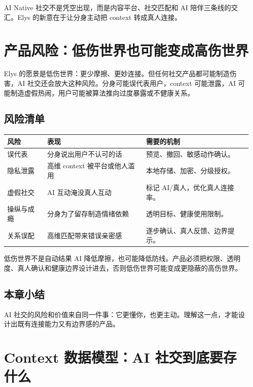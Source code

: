 \documentclass[a4paper]{article}
\begin{document}
AI Native 社交不是凭空出现，而是内容平台、社交匹配和 AI 陪伴三条线的交汇。Elys 的新意在于让分身主动把 context 转成真人连接。

\section{产品风险：低伤世界也可能变成高伤世界}

Elys 的愿景是低伤世界：更少摩擦、更妙连接。但任何社交产品都可能制造伤害，AI 社交还会放大这种风险。分身可能误代表用户，context 可能泄露，AI 可能制造虚假热闹，用户可能被算法推向过度暴露或不健康关系。

\subsection{风险清单}

\noindent\begin{tabularx}{\textwidth}{p{}p{}X}
\toprule
风险 & 表现 & 需要的机制 \\
\midrule
误代表 & 分身说出用户不认可的话 & 预览、撤回、敏感动作确认。 \\
隐私泄露 & 高维 context 被平台或他人滥用 & 本地存储、加密、分级授权。 \\
虚假社交 & AI 互动淹没真人互动 & 标记 AI/真人，优化真人连接率。 \\
操纵与成瘾 & 分身为了留存制造情绪依赖 & 透明目标、健康使用限制。 \\
关系误配 & 高维匹配带来错误亲密感 & 逐步确认、真人反馈、边界提示。 \\
\bottomrule
\end{tabularx}

\begin{warningbox}{低伤世界不是自动结果}
AI 降低摩擦，也可能降低防线。产品必须把权限、透明度、真人确认和健康边界设计进去，否则低伤世界可能变成更隐蔽的高伤世界。
\end{warningbox}

\subsection{本章小结}

AI 社交的风险和价值来自同一件事：它更懂你，也更主动。理解这一点，才能设计出既有连接能力又有边界感的产品。


\section{Context 数据模型：AI 社交到底要存什么}
\end{document}
